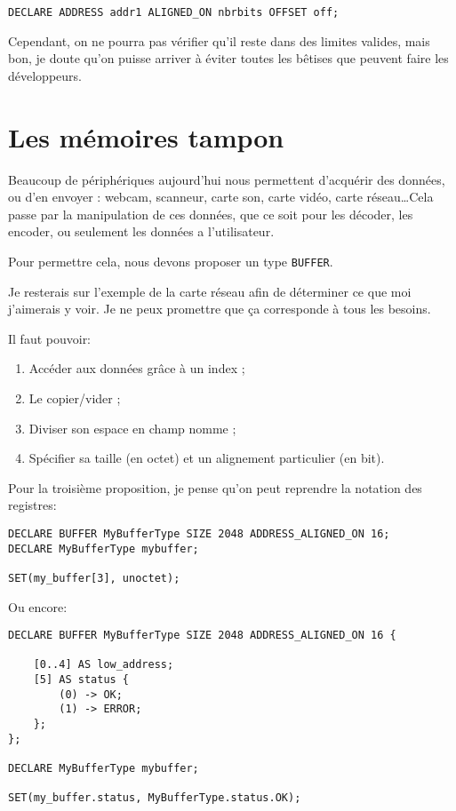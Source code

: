 \documentclass[french]{rtxreport}
\begin{document}
\begin{lstlisting}
DECLARE ADDRESS addr1 ALIGNED_ON nbrbits OFFSET off;
\end{lstlisting}

Cependant, on ne pourra pas vérifier qu’il reste dans des limites valides, mais bon, je doute qu’on puisse arriver à éviter toutes les bêtises que peuvent faire les développeurs.

\section{Les mémoires tampon}

Beaucoup de périphériques aujourd’hui nous permettent d’acquérir des données, ou d’en envoyer : webcam, scanneur, carte son, carte vidéo, carte réseau\ldots Cela passe par la manipulation de ces données, que ce soit pour les décoder, les encoder, ou seulement les données a l’utilisateur.

Pour permettre cela, nous devons proposer un type \texttt{BUFFER}.

Je resterais sur l’exemple de la carte réseau afin de déterminer ce que moi j’aimerais y voir. Je ne peux promettre que ça corresponde à tous les besoins.

Il faut pouvoir:
\begin{enumerate}
	\item Accéder aux données grâce à un index ; 
	\item Le copier/vider ; 
	\item Diviser son espace en champ nomme ; 
	\item Spécifier sa taille (en octet) et un alignement particulier (en bit).
\end{enumerate}

Pour la troisième proposition, je pense qu’on peut reprendre la notation des registres:

\begin{lstlisting}
DECLARE BUFFER MyBufferType SIZE 2048 ADDRESS_ALIGNED_ON 16;
DECLARE MyBufferType mybuffer;

SET(my_buffer[3], unoctet);
\end{lstlisting}

Ou encore:

\begin{lstlisting}
DECLARE BUFFER MyBufferType SIZE 2048 ADDRESS_ALIGNED_ON 16 {

	[0..4] AS low_address;
	[5] AS status {
		(0) -> OK;
		(1) -> ERROR;
	};
};

DECLARE MyBufferType mybuffer;

SET(my_buffer.status, MyBufferType.status.OK);
\end{lstlisting}
\end{document}
